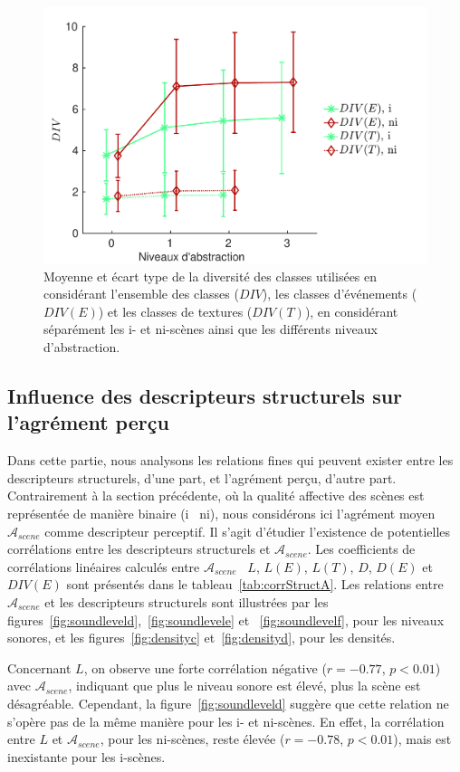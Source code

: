 \begin{figure}[t]
        \myfloatalign
        \includegraphics[width=.8\linewidth]{gfx/ch_5/xp1_div_1}
       \caption{Moyenne et écart type de la diversité des classes utilisées en considérant l'ensemble des classes ($DIV$), les classes d'événements ($DIV(E)$) et les classes de textures ($DIV(T)$), en considérant séparément les i- et ni-scènes ainsi que les différents niveaux d'abstraction.}\label{fig:diversity}
\end{figure}

\subsection{Influence des descripteurs structurels sur l'agrément perçu}
\label{sec:ch5_corrDesStruct}

Dans cette partie, nous analysons les relations fines qui peuvent exister entre les descripteurs structurels, d'une part, et l'agrément perçu, d'autre part. Contrairement à la section précédente, où la qualité affective des scènes est représentée de manière binaire (i \vs~ni), nous considérons ici l'agrément moyen $\mathcal{A}_{scene}$ comme descripteur perceptif. Il s'agit d'étudier l'existence de potentielles corrélations entre les descripteurs structurels et $\mathcal{A}_{scene}$. Les coefficients de corrélations linéaires calculés entre $\mathcal{A}_{scene}$ \vs~$L$, $L(E)$, $L(T)$, $D$, $D(E)$ et $DIV(E)$ sont présentés dans le tableau~\ref{tab:corrStructA}. Les relations entre $\mathcal{A}_{scene}$ et les descripteurs structurels sont illustrées par les figures~\ref{fig:soundleveld},~\ref{fig:soundlevele} et ~\ref{fig:soundlevelf}, pour les niveaux sonores, et les figures~\ref{fig:densityc} et~\ref{fig:densityd}, pour les densités. 

Concernant $L$, on observe une forte corrélation négative ($r=-0.77$, $p<0.01$) avec $\mathcal{A}_{scene}$, indiquant que plus le niveau sonore est élevé, plus la scène est désagréable. Cependant, la figure~\ref{fig:soundleveld} suggère que cette relation ne s'opère pas de la même manière pour les i- et ni-scènes. En effet, la corrélation entre $L$ et $\mathcal{A}_{scene}$, pour les ni-scènes, reste élevée ($r=-0.78$, $p<0.01$), mais est inexistante pour les i-scènes. 

